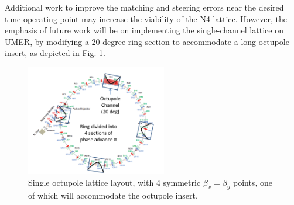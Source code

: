 Additional work to improve the matching and steering errors near the desired tune operating point may increase the viability of the N4 lattice. However, the emphasis of future work will be on implementing the single-channel lattice on UMER, by modifying a 20 degree ring section to accommodate a long octupole insert, as depicted in Fig. \ref{SClattice}.

\begin{figure}[!tb]
   \centering
   \includegraphics*[width=174pt]{6.figures/SC_lattice}
   \caption{Single octupole lattice layout, with 4 symmetric $\beta_x = \beta_y$ points, one of which will accommodate the octupole insert.}
   \label{SClattice}
\end{figure}